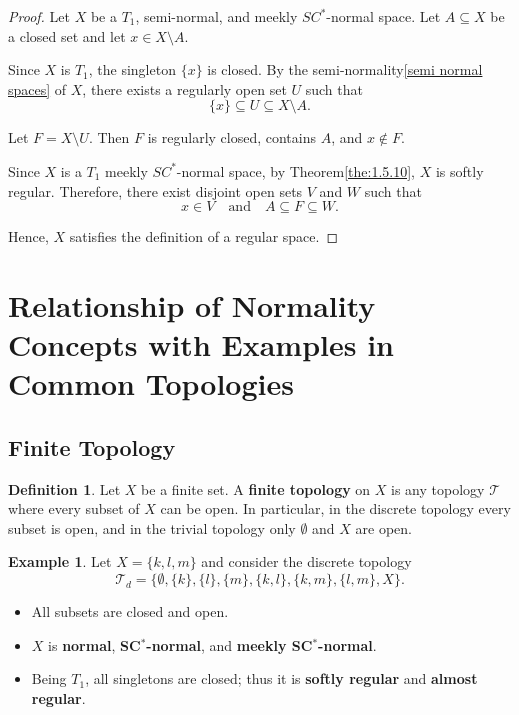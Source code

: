 \documentclass[12pt,a4paper,twoside]{report}  %
\theoremstyle{plain}
\theoremstyle{definition}
\newtheorem{definition}[theorem]{Definition}
\newtheorem{example}[theorem]{Example}
\begin{document}
\begin{proof}
Let $X$ be a $T_1$, semi-normal, and meekly $SC^*$-normal space.  
Let $A \subseteq X$ be a closed set and let $x \in X \setminus A$.  

Since $X$ is $T_1$, the singleton $\{x\}$ is closed. By the semi-normality\ref{semi normal spaces} of $X$, there exists a regularly open set $U$ such that
\[
\{x\} \subseteq U \subseteq X \setminus A.
\]

Let $F = X \setminus U$. Then $F$ is regularly closed, contains $A$, and $x \notin F$.  

Since $X$ is a $T_1$ meekly $SC^*$-normal space, by Theorem\ref{the:1.5.10}, $X$ is softly regular. Therefore, there exist disjoint open sets $V$ and $W$ such that
\[
x \in V \quad \text{and} \quad A \subseteq F \subseteq W.
\]

Hence, $X$ satisfies the definition of a regular space\cite{stone1937applications}.
\end{proof}


\section{Relationship of Normality Concepts with Examples in Common Topologies}

\subsection{Finite Topology}

\begin{definition}
Let $X$ be a finite set. A \textbf{finite topology}\cite{steen1978counterexamples,engelking1977general} on $X$ is any topology $\mathcal{T}$ where every subset of $X$ can be open. In particular, in the discrete topology every subset is open, and in the trivial topology only $\emptyset$ and $X$ are open.
\end{definition}

\begin{example}
Let $X = \{k, l, m\}$ and consider the discrete topology 
\[
\mathcal{T}_d = \{\emptyset, \{k\}, \{l\}, \{m\}, \{k,l\}, \{k,m\}, \{l,m\}, X\}.
\] 
\begin{itemize}
    \item All subsets are closed and open.
    \item $X$ is \textbf{normal}, \textbf{SC$^*$-normal}, and \textbf{meekly SC$^*$-normal}.
    \item Being $T_1$, all singletons are closed; thus it is \textbf{softly regular} and \textbf{almost regular}.
\end{itemize}
\end{example}
\end{document}
